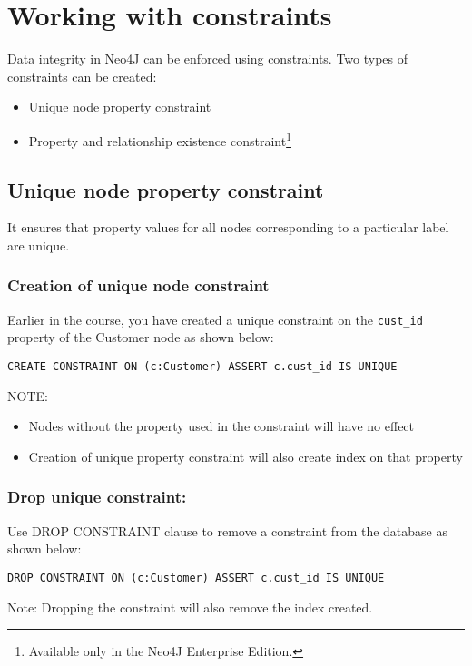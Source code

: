 \documentclass[../main.tex]{subfiles}
\begin{document}
\section{Working with constraints}
Data integrity in Neo4J can be enforced using constraints. Two types of constraints can be created:
\begin{itemize}
	\item Unique node property constraint
	\item Property and relationship existence constraint\footnote{\small{Available only in the Neo4J Enterprise Edition.}}
\end{itemize}
\subsection{Unique node property constraint}
It ensures that property values for all nodes corresponding to a particular label are unique.
\subsubsection{Creation of unique node constraint}
Earlier in the course, you have created a unique constraint on the \lstinline{cust_id} property of the Customer node as shown below:
\begin{lstlisting}[language=cypher]
CREATE CONSTRAINT ON (c:Customer) ASSERT c.cust_id IS UNIQUE
\end{lstlisting}
NOTE: 
\begin{itemize}
\item Nodes without the property used in the constraint will have no effect
\item Creation of unique property constraint will also create index on that property
\end{itemize}
\subsubsection{Drop unique constraint:}
Use DROP CONSTRAINT clause to remove a constraint from the database as shown below:
\begin{lstlisting}[language=cypher]
DROP CONSTRAINT ON (c:Customer) ASSERT c.cust_id IS UNIQUE
\end{lstlisting}
Note: Dropping the constraint will also remove the index created.









\printglossaries
\end{document}
